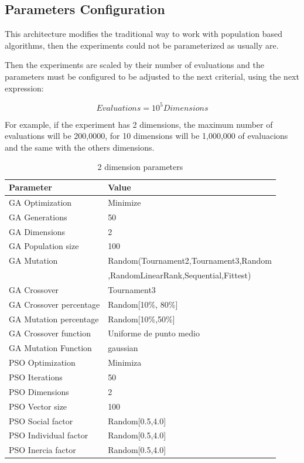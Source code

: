 \documentclass[runningheads]{llncs}
\begin{document}
\subsection{Parameters Configuration} 

This architecture modifies the traditional way to work with population based
algorithms, then the experiments could not be parameterized as usually are.

Then the experiments are scaled by their number of evaluations and the
parameters must be configured to be adjusted to the next criterial, using the
next expression:

\begin{equation}
    \label{eq:hesitancy-interpretation}
   Evaluations = 10^{5} Dimensions
   \end{equation}

For example, if the experiment has 2 dimensions, the maximum number of
evaluations will be 200,0000, for 10 dimensions will be 1,000,000 of evaluacions
and the same with the others dimensions.









   \begin{table}[htp]
    \caption{2 dimension parameters}
    \label{table:ga-pso-parameters-2}
    \centering
    \begin{tabular}{|l|l|}
    \hline
    Parameter & Value \\
    \hline
    \hline
    GA Optimization & Minimize \\
    \hline
    GA Generations & 50 \\
    \hline
    GA Dimensions & 2 \\
    \hline
    GA Population size & 100 \\
    \hline
    GA Mutation & Random(Tournament2,Tournament3,Random \\
    &  ,RandomLinearRank,Sequential,Fittest)\\
    \hline
    GA Crossover & Tournament3 \\
    \hline
    GA Crossover percentage & Random[10\%, 80\%] \\
    \hline
    GA Mutation percentage & Random[10\%,50\%] \\
    \hline
    GA Crossover function & Uniforme de punto medio \\
    \hline
    GA Mutation Function & gaussian \\
    \hline
    PSO Optimization & Minimiza \\
    \hline
    PSO Iterations & 50 \\
    \hline
    PSO Dimensions & 2 \\
    \hline
    PSO Vector size & 100 \\
    \hline
    PSO Social factor & Random[0.5,4.0] \\
    \hline
    PSO Individual factor & Random[0.5,4.0] \\
    \hline
    PSO Inercia factor & Random[0.5,4.0] \\
    \hline
    \end{tabular}
    \end{table}
\end{document}
